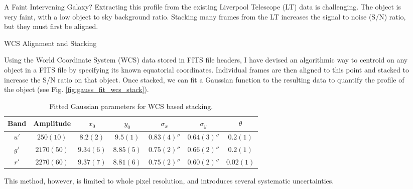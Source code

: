 \documentclass[final]{beamer}
\newlength{\sepwidth}
\newlength{\colwidth}
\newcommand{\separatorcolumn}{\begin{column}{\sepwidth}\end{column}}
\begin{document}
\begin{frame}[t]
\begin{columns}[t]
\begin{column}{\colwidth}
\begin{block}{\LARGE A Faint Intervening Galaxy?}
Extracting this profile from the existing Liverpool Telescope (LT) data is challenging. The object is very faint, with a low object to sky background ratio. Stacking many frames from the LT increases the signal to noise (S/N) ratio, but they must first be aligned.
\end{block}

\begin{alertblock}{\LARGE WCS Alignment and Stacking}

\Large Using the World Coordinate System (WCS) data stored in FITS file headers, I have devised an algorithmic way to centroid on any object in a FITS file by specifying its known equatorial coordinates. Individual frames are then aligned to this point and stacked to increase the S/N ratio on that object. Once stacked, we can fit a Gaussian function to the resulting data to quantify the profile of the object (see Fig. \ref{fig:gauss_fit_wcs_stack}).
\newline
\begin{table}[h!]
    \centering
    \begin{tabular}{| c | c | c | c | c | c | c |} \hline
        Band & Amplitude & $x_0$ & $y_0$ & $\sigma_x$ & $\sigma_y$ & $\theta$ \\ \hline \hline
        $u'$ & $250(10)$ & $8.2(2)$ & $9.5(1)$ & $0.83(4)''$ & $0.64(3)''$ & $0.2(1)$ \\
        $g'$ & $2170(50)$ & $9.34(6)$ & $8.85(5)$ & $0.75(2)''$ & $0.66(2)''$ & $0.2(1)$  \\
        $r'$ & $2270(60)$ & $9.37(7)$ & $8.81(6)$ & $0.75(2)''$ & $0.60(2)''$ & $0.02(1)$ \\ \hline
    \end{tabular}
    \caption{\Large Fitted Gaussian parameters for WCS based stacking.}
    \label{tab:wcs_gaussians}
\end{table}
This method, however, is limited to whole pixel resolution, and introduces several systematic uncertainties.
\end{alertblock}

\end{column}

\separatorcolumn

\begin{column}{\colwidth}


\end{column}
\end{columns}
\end{frame}
\end{document}

